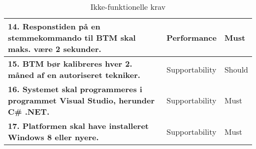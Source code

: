 \begin{table} [htbp]
\begin{tabular}{|p{10cm}|l|l|}
\textbf{14. Responstiden på en stemmekommando til BTM skal maks. være 2 sekunder.} & Performance & Must \\ \hline
\textbf{15. BTM bør kalibreres hver 2. måned af en autoriseret tekniker. } & Supportability & Should \\ \hline
\textbf{16. Systemet skal programmeres i programmet Visual Studio, herunder C\# .NET.} & Supportability & Must \\ \hline
\textbf{17. Platformen skal have installeret Windows 8 eller nyere.} & Supportability & Must \\ \hline
\end{tabular}
\caption{Ikke-funktionelle krav}
\label{tb:ikkefunkkrav} 
\end{table}
